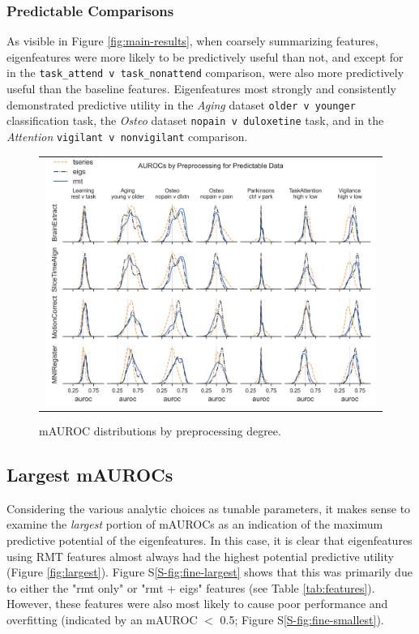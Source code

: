 \documentclass[12pt]{spieman}  %
\newcommand{\code}[1]{\small \texttt{#1} \normalsize}
\begin{document}
\begin{spacing}{2}
\subsubsection{Predictable Comparisons}
As visible in Figure \ref{fig:main-results}, when coarsely summarizing
features, eigenfeatures were more likely to be predictively useful than not,
and except for in the \code{task\_attend v task\_nonattend} comparison, were
also more predictively useful than the baseline features.  Eigenfeatures most
strongly and consistently demonstrated predictive utility in the \textit{Aging}
dataset \code{older v younger} classification task, the \textit{Osteo} dataset
\code{nopain v duloxetine} task, and in the \textit{Attention} \code{vigilant v
nonvigilant} comparison.



\begin{figure}
\begin{center}
\begin{tabular}{c}
\includegraphics[width=6.5in]{coarse_feature_by_preproc_predictive_subgroup.png}
\end{tabular}
\end{center}
\caption
{ \label{fig:preproc} mAUROC distributions by preprocessing degree.}
\end{figure}

\subsection{Largest mAUROCs}
Considering the various analytic choices as tunable parameters, it makes sense
to examine the \textit{largest} portion of mAUROCs as an indication of the
maximum predictive potential of the eigenfeatures. In this case, it is clear
that eigenfeatures using RMT features almost always had the highest potential
predictive utility (Figure \ref{fig:largest}). Figure S\ref{S-fig:fine-largest}
shows that this was primarily due to either the "rmt only" or "rmt + eigs"
features (see Table \ref{tab:features}). However, these features were also most
likely to cause poor performance and overfitting (indicated by an mAUROC \(<\)
0.5; Figure S\ref{S-fig:fine-smallest}).


\end{spacing}
\end{document}
